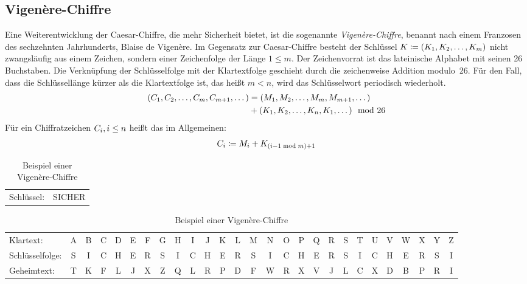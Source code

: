 \subsection{Vigenère-Chiffre}
\label{ssec:vigenere}
Eine Weiterentwicklung der Caesar-Chiffre, die mehr Sicherheit bietet, ist die sogenannte \emph{Vigenère-Chiffre}, benannt nach einem Franzosen des
sechzehnten Jahrhunderts, Blaise de Vigenère. Im Gegensatz zur Caesar-Chiffre besteht der Schlüssel $K \coloneqq (K_{1},K_{2},\dots,K_{m})$ nicht zwangsläufig aus einem Zeichen, sondern einer Zeichenfolge der Länge $1 \leq m$.
Der Zeichenvorrat ist das lateinische Alphabet mit seinen 26 Buchstaben. Die Verknüpfung der Schlüsselfolge mit der Klartextfolge geschieht durch die zeichenweise Addition modulo~26. Für den Fall, dass die Schlüssellänge kürzer als die Klartextfolge ist, das heißt $m < n$, wird das Schlüsselwort periodisch wiederholt.
\begin{align*}
	\begin{split}
		(C_{1},C_{2},\dots,C_{m},C_{m+1},\dots) &= (M_{1},M_{2},\dots,M_{m},M_{m+1},\dots)\\ 
		&+ (K_{1},K_{2},\dots,K_{n},K_{1},\dots) \mod 26
	\end{split}
\end{align*}
Für ein Chiffratzeichen $C_{i}, i \leq n$ heißt das im Allgemeinen:
\begin{align*}
	C_{i} \coloneqq M_{i} + K_{(i-1 \bmod m)+1}
\end{align*}

\begin{table}[h]
	\centering
	\setlength{\tabcolsep}{2pt}
	\begin{tabular}{ll}
		Schlüssel: 
		& SICHER
	\end{tabular}
	\begin{tabular}{l*{26}{c}}
		Klartext:
		&A&B&C&D&E&F&G&H&I&J&K&L&M&N&O&P&Q&R&S&T&U&V&W&X&Y&Z\\
		Schlüsselfolge:
		&S&I&C&H&E&R&S&I&C&H&E&R&S&I&C&H&E&R&S&I&C&H&E&R&S&I\\
		Geheimtext:
		&T&K&F&L&J&X&Z&Q&L&R&P&D&F&W&R&X&V&J&L&C&X&D&B&P&R&I\\
	\end{tabular}
	\caption{Beispiel einer Vigenère-Chiffre}
\end{table}

